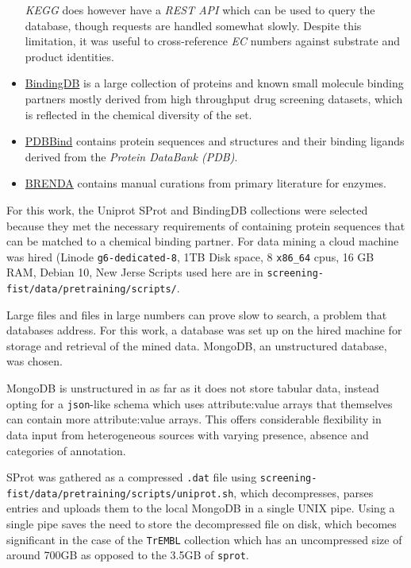 \documentclass[16pt]{book}
\begin{document}
\begin{itemize}
		\textit{KEGG} does however have a \textit{REST API} which can be used to query the database, though requests are handled somewhat slowly.
		Despite this limitation, it was useful to cross-reference \textit{EC} numbers against substrate and product identities.
	\item \href{https://www.bindingdb.org/bind/index.jsp}{BindingDB} is a large collection of proteins and known small molecule binding partners mostly derived from high throughput drug screening datasets, which is reflected in the chemical diversity of the set.
	\item \href{http://pdbbind.org.cn/}{PDBBind} contains protein sequences and structures and their binding ligands derived from the \textit{Protein DataBank (PDB)}.
	\item \href{https://www.brenda-enzymes.org/}{BRENDA} contains manual curations from primary literature for enzymes.
\end{itemize}


For this work, the Uniprot SProt and BindingDB collections were selected because they met the necessary requirements of containing protein sequences that can be matched to a chemical binding partner.
For data mining a cloud machine was hired (Linode \texttt{g6-dedicated-8}, 1TB Disk space, 8 \texttt{x86\_64} cpus, 16 GB RAM, Debian 10, New Jerse
Scripts used here are in \texttt{screening-fist/data/pretraining/scripts/}.

Large files and files in large numbers can prove slow to search, a problem that databases address.
For this work, a database was set up on the hired machine for storage and retrieval of the mined data.
MongoDB, an unstructured database, was chosen. 

MongoDB is unstructured in as far as it does not store tabular data, instead opting for a \texttt{json}-like schema which uses attribute:value arrays that themselves can contain more attribute:value arrays.
This offers considerable flexibility in data input from heterogeneous sources with varying presence, absence and categories of annotation.

SProt was gathered as a compressed \texttt{.dat} file using \texttt{screening-fist/data/pretraining/scripts/uniprot.sh}, which decompresses, parses entries and uploads them to the local MongoDB in a single UNIX pipe.
Using a single pipe saves the need to store the decompressed file on disk, which becomes significant in the case of the \texttt{TrEMBL} collection which has an uncompressed size of around 700GB as opposed to the 3.5GB of \texttt{sprot}.
\end{document}
